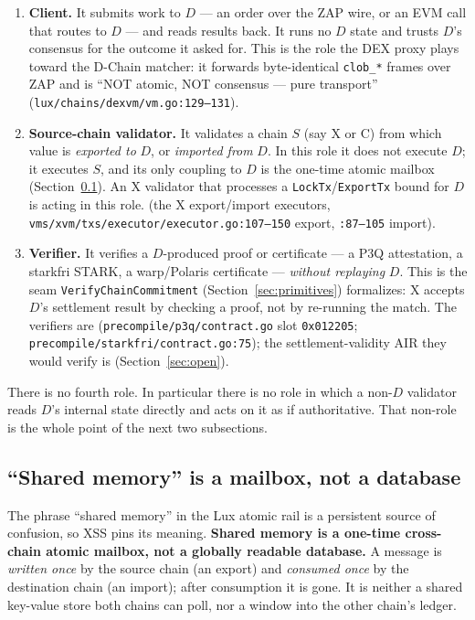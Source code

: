 \begin{enumerate}[leftmargin=2em]
\item \textbf{Client.} It submits work to $D$ --- an order over the ZAP
  wire, or an EVM call that routes to $D$ --- and reads results back. It
  runs no $D$ state and trusts $D$'s consensus for the outcome it asked
  for. This is the role the DEX proxy plays toward the D-Chain matcher:
  it forwards byte-identical \texttt{clob\_*} frames over ZAP and is
  ``NOT atomic, NOT consensus --- pure transport''
  (\texttt{lux/chains/dexvm/vm.go:129--131}). \IMPL{}
\item \textbf{Source-chain validator.} It validates a chain $S$ (say X
  or C) from which value is \emph{exported to} $D$, or \emph{imported
  from} $D$. In this role it does not execute $D$; it executes $S$, and
  its only coupling to $D$ is the one-time atomic mailbox
  (Section~\ref{sec:mailbox}). An X validator that processes a
  \texttt{LockTx}/\texttt{ExportTx} bound for $D$ is acting in this role.
  \IMPL{} (the X export/import executors,
  \texttt{vms/xvm/txs/executor/executor.go:107--150} export,
  \texttt{:87--105} import).
\item \textbf{Verifier.} It verifies a $D$-produced proof or certificate
  --- a P3Q attestation, a starkfri STARK, a warp/Polaris certificate
  --- \emph{without replaying} $D$. This is the seam
  \texttt{VerifyChainCommitment} (Section~\ref{sec:primitives})
  formalizes: X accepts $D$'s settlement result by checking a proof, not
  by re-running the match. The verifiers are \IMPL{}
  (\texttt{precompile/p3q/contract.go} slot \texttt{0x012205};
  \texttt{precompile/starkfri/contract.go:75}); the settlement-validity
  AIR they would verify is \DESIGN{} (Section~\ref{sec:open}).
\end{enumerate}

\noindent There is no fourth role. In particular there is no role in
which a non-$D$ validator reads $D$'s internal state directly and acts
on it as if authoritative. That non-role is the whole point of the next
two subsections.

\subsection{``Shared memory'' is a mailbox, not a database}
\label{sec:mailbox}

The phrase ``shared memory'' in the Lux atomic rail is a persistent
source of confusion, so XSS pins its meaning. \textbf{Shared memory is a
one-time cross-chain atomic mailbox, not a globally readable database.}
A message is \emph{written once} by the source chain (an export) and
\emph{consumed once} by the destination chain (an import); after
consumption it is gone. It is neither a shared key-value store both
chains can poll, nor a window into the other chain's ledger.

